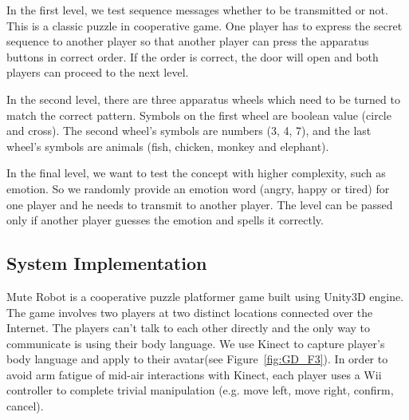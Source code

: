 In the first level, we test sequence messages whether to be transmitted or not. This is a classic puzzle in cooperative game. One player has to express the secret sequence to another player so that another player can press the apparatus buttons in correct order. If the order is correct, the door will open and both players can proceed to the next level.


In the second level, there are three apparatus wheels which need to be turned to match the correct pattern. Symbols on the first wheel are boolean value (circle and cross). The second wheel's symbols are numbers (3, 4, 7), and the last wheel's symbols are animals (fish, chicken, monkey and elephant).


In the final level, we want to test the concept with higher complexity, such as emotion. So we randomly provide an emotion word (angry, happy or tired) for one player and he needs to transmit to another player. The level can be passed only if another player guesses the emotion and spells it correctly.

\subsection{System Implementation}


Mute Robot is a cooperative puzzle platformer game built using Unity3D engine. The game involves two players at two distinct locations connected over the Internet. The players can't talk to each other directly and the only way to communicate is using their body language. We use Kinect to capture player's body language and apply to their avatar(see Figure~\ref{fig:GD_F3}). In order to avoid arm fatigue of mid-air interactions\cite{GD6} with Kinect, each player uses a Wii controller to complete trivial manipulation (e.g. move left, move right, confirm, cancel).

